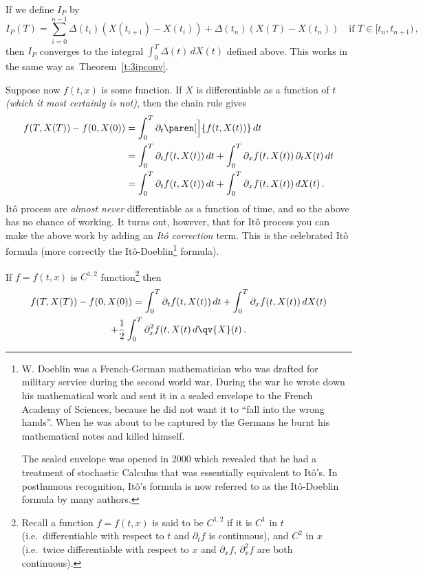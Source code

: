 \begin{remark}
  If we define $I_P$ by
  \begin{equation*}
    I_P(T)
      = \sum_{i=0}^{n-1} \Delta(t_i) (X(t_{i+1}) - X(t_i))
	+ \Delta(t_n) (X(T) - X(t_n))
    \quad\text{if } T \in [t_n, t_{n+1})\,,
  \end{equation*}
  then $I_P$ converges to the integral $\int_0^T \Delta(t) \, d X(t)$ defined above.
  This works in the same way as~Theorem~\ref{t:3ipconv}.
\end{remark}


Suppose now $f(t, x)$ is some function.
If $X$ is differentiable as a function of $t$ \emph{(which it most certainly is not)}, then the chain rule gives
\begin{align*}
  f(T, X(T)) - f(0, X(0))
    &= \int_0^T \partial_t \paren[\Big]{ f(t, X(t)) } \, dt
  \\
    &= \int_0^T \partial_t f( t, X(t)) \, dt
      + \int_0^T \partial_x f( t, X(t) ) \, \partial_t X(t) \, dt
  \\
    &= \int_0^T \partial_t f( t, X(t) ) \, dt
      + \int_0^T \partial_x f(t, X(t) ) \, dX(t)\,.
\end{align*}
It\^o process are \emph{almost never} differentiable as a function of time, and so the above has no chance of working.
It turns out, however, that for It\^o process you can make the above work by adding an \emph{It\^o correction} term.
This is the celebrated It\^o formula (more correctly the It\^o-Doeblin\footnote{%
  W. Doeblin was a French-German mathematician who was drafted for military service during the second world war.
  During the war he wrote down his mathematical work and sent it in a sealed envelope to the French Academy of Sciences, because he did not want it to ``fall into the wrong hands''.
  When he was about to be captured by the Germans he burnt his mathematical notes and killed himself.

  The sealed envelope was opened in 2000 which revealed that he had a treatment of stochastic Calculus that was essentially equivalent to It\^o's.
  In posthumous recognition, It\^o's formula is now referred to as the It\^o-Doeblin formula by many authors.
}
formula).

\begin{theorem}
  If $f = f(t, x)$ is $C^{1,2}$ function\footnote{%
    Recall a function $f = f(t, x)$ is said to be $C^{1,2}$ if it is $C^1$ in $t$ (i.e.\ differentiable with respect to $t$ and $\partial_t f$ is continuous), and $C^2$ in $x$ (i.e.\ twice differentiable with respect to $x$ and $\partial_x f$, $\partial_x^2 f$ are both continuous).
  }
  then
  \begin{multline}\label{e:3ito}
    f(T, X(T)) - f(0, X(0))
      = \int_0^T \partial_t f( t, X(t) ) \, dt
	+ \int_0^T \partial_x f(t, X(t) ) \, dX(t)
    \\
	+ \frac{1}{2} \int_0^T \partial_x^2 f(t, X(t) \, d\qv{X}(t)\,.
  \end{multline}
\end{theorem}

